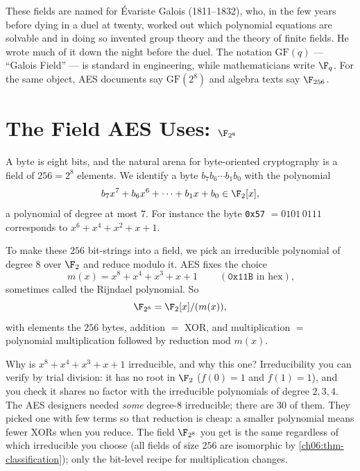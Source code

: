 \begin{historybox}
These fields are named for \'Evariste Galois (1811--1832), who, in the few
years before dying in a duel at twenty, worked out which polynomial equations
are solvable and in doing so invented group theory and the theory of finite
fields. He wrote much of it down the night before the duel. The notation
$\mathrm{GF}(q)$ --- ``Galois Field'' --- is standard in engineering, while
mathematicians write $\F_q$. For the same object, AES documents say
$\mathrm{GF}(2^8)$ and algebra texts say $\F_{256}$.
\end{historybox}

\section{The Field AES Uses: $\F_{2^8}$}
\label{ch06:f256}

A byte is eight bits, and the natural arena for byte-oriented cryptography is
a field of $256 = 2^8$ elements. We identify a byte $b_7 b_6 \cdots b_1 b_0$
with the polynomial
\[
b_7 x^7 + b_6 x^6 + \dots + b_1 x + b_0 \in \F_2[x],
\]
a polynomial of degree at most $7$. For instance the byte
\texttt{0x57} $= 0101\,0111$ corresponds to $x^6 + x^4 + x^2 + x + 1$.

To make these $256$ bit-strings into a field, we pick an irreducible
polynomial of degree $8$ over $\F_2$ and reduce modulo it. AES fixes the
choice
\[
\boxed{\ m(x) = x^8 + x^4 + x^3 + x + 1\ }
\qquad(\texttt{0x11B} \text{ in hex}),
\]
sometimes called the Rijndael polynomial. So
\[
\F_{2^8} = \F_2[x]/(m(x)),
\]
with elements the $256$ bytes, addition $=$ XOR, and multiplication $=$
polynomial multiplication followed by reduction mod $m(x)$.

\begin{whybox}
Why is $x^8+x^4+x^3+x+1$ irreducible, and why this one? Irreducibility you
can verify by trial division: it has no root in $\F_2$ ($f(0)=1$ and
$f(1)=1$), and you check it shares no factor with the irreducible polynomials
of degree $2,3,4$. The AES designers needed \emph{some} degree-8 irreducible;
there are $30$ of them. They picked one with few terms so that reduction is
cheap: a smaller polynomial means fewer XORs when you reduce. The field
$\F_{2^8}$ you get is the same regardless of which irreducible you choose (all
fields of size $256$ are isomorphic by \autoref{ch06:thm-classification});
only the bit-level recipe for multiplication changes.
\end{whybox}

